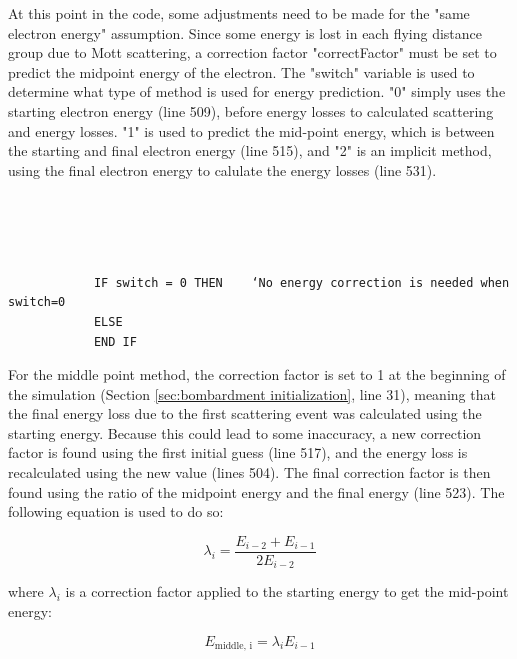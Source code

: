 \documentclass[10pt, reqno]{exam}
\begin{document}
At this point in the code, some adjustments need to be made for the "same electron energy" assumption. Since some energy is lost in each flying distance group due to Mott scattering, a correction factor "correctFactor" must be set to predict the midpoint energy of the electron. The "switch" variable is used to determine what type of method is used for energy prediction. "0" simply uses the starting electron energy (line 509), before energy losses to calculated scattering and energy losses. "1" is used to predict the mid-point energy, which is between the starting and final electron energy (line 515), and "2" is an implicit method, using the final electron energy to calulate the energy losses (line 531). \par

\begin{verbatim}

    
    
    
            IF switch = 0 THEN    ‘No energy correction is needed when switch=0
            ELSE
            END IF
\end{verbatim}
For the middle point method, the correction factor is set to 1 at the beginning of the simulation (Section \ref{sec:bombardment initialization}, line 31), meaning that the final energy loss due to the first scattering event was calculated using the starting energy. Because this could lead to some inaccuracy, a new correction factor is found using the first initial guess (line 517), and the energy loss is recalculated using the new value (lines 504). The final correction factor is then found using the ratio of the midpoint energy and the final energy (line 523). The following equation is used to do so: \par

\begin{equation}
    \lambda_i = \frac{E_{i - 2} + E_{i - 1}}{2E_{i-2}}
\end{equation}

where $\lambda_i$ is a correction factor applied to the starting energy to get the mid-point energy:

\begin{equation}
    E_{\text{middle, i}} = \lambda_i E_{i - 1}
\end{equation}
\end{document}
